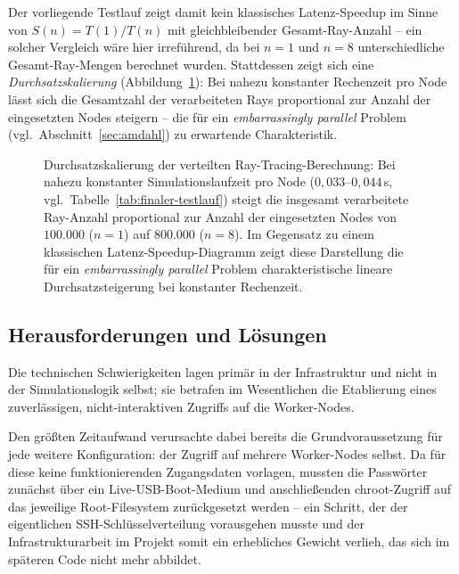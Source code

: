 \documentclass{article}
\begin{document}
Der vorliegende Testlauf zeigt damit kein klassisches
Latenz-Speedup im Sinne von $S(n) = T(1)/T(n)$ mit gleichbleibender
Gesamt-Ray-Anzahl -- ein solcher Vergleich wäre hier irreführend, da bei
$n=1$ und $n=8$ unterschiedliche Gesamt-Ray-Mengen berechnet wurden.
Stattdessen zeigt sich eine \emph{Durchsatzskalierung}
(Abbildung~\ref{fig:durchsatz}): Bei nahezu konstanter Rechenzeit pro
Node lässt sich die Gesamtzahl der verarbeiteten Rays proportional zur
Anzahl der eingesetzten Nodes steigern -- die für ein \emph{embarrassingly
parallel} Problem (vgl.\ Abschnitt~\ref{sec:amdahl}) zu erwartende
Charakteristik.

\begin{figure}[htbp]
 \centering
 \caption{Durchsatzskalierung der verteilten Ray-Tracing-Berechnung: Bei
 nahezu konstanter Simulationslaufzeit pro Node
 ($0{,}033$--$0{,}044\,$s, vgl.\ Tabelle~\ref{tab:finaler-testlauf})
 steigt die insgesamt verarbeitete Ray-Anzahl proportional zur Anzahl
 der eingesetzten Nodes von $100.000$ ($n=1$) auf $800.000$ ($n=8$).
 Im Gegensatz zu einem klassischen Latenz-Speedup-Diagramm zeigt diese
 Darstellung die für ein \emph{embarrassingly parallel} Problem
 charakteristische lineare Durchsatzsteigerung bei konstanter
 Rechenzeit.}
 \label{fig:durchsatz}
\end{figure}

\subsection{Herausforderungen und Lösungen}
Die technischen Schwierigkeiten lagen primär in der Infrastruktur und
nicht in der Simulationslogik selbst; sie betrafen im Wesentlichen die
Etablierung eines zuverlässigen, nicht-interaktiven Zugriffs auf die
Worker-Nodes.

Den größten Zeitaufwand verursachte dabei bereits die Grundvoraussetzung
für jede weitere Konfiguration: der Zugriff auf mehrere Worker-Nodes selbst.
Da für diese keine funktionierenden Zugangsdaten vorlagen, mussten die
Passwörter zunächst über ein Live-USB-Boot-Medium und anschließenden
chroot-Zugriff auf das jeweilige Root-Filesystem zurückgesetzt werden --
ein Schritt, der der eigentlichen SSH-Schlüsselverteilung vorausgehen
musste und der Infrastrukturarbeit im Projekt somit ein erhebliches
Gewicht verlieh, das sich im späteren Code nicht mehr abbildet.
\end{document}
